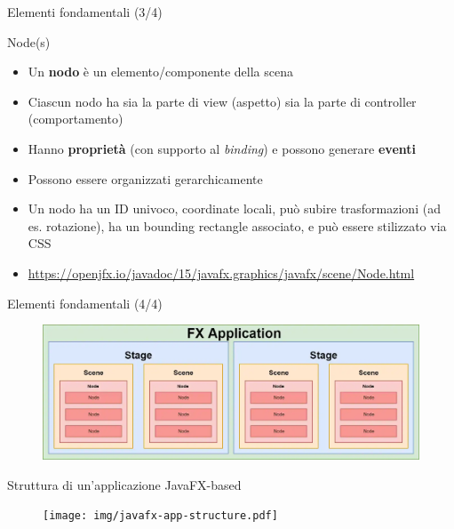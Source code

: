 \documentclass[xcolor=dvipsnames,presentation]{beamer}
\begin{document}
\begin{frame} {Elementi fondamentali (3/4)}
\begin{block}{Node(s)}
\begin{itemize}
\item Un \textbf{nodo} è un elemento/componente della scena
\item Ciascun nodo ha sia la parte di view (aspetto) sia la parte di controller (comportamento)
\item Hanno \textbf{proprietà} (con supporto al \emph{binding}) e possono generare \textbf{eventi}
\item Possono essere organizzati gerarchicamente
\item Un nodo ha un ID univoco, coordinate locali, può subire trasformazioni (ad es. rotazione), ha un bounding rectangle associato, e può essere stilizzato via CSS
\item \url{https://openjfx.io/javadoc/15/javafx.graphics/javafx/scene/Node.html}
\end{itemize}
\end{block}
\end{frame}

\begin{frame}{Elementi fondamentali (4/4)}
\begin{figure}
\includegraphics[width=\textwidth]{img/javafx-app.png}
\end{figure}
\end{frame}

%

\begin{frame}{Struttura di un'applicazione JavaFX-based}
\begin{figure}
\texttt{[image: img/javafx-app-structure.pdf]}
\end{figure}
\end{frame}
\end{document}
